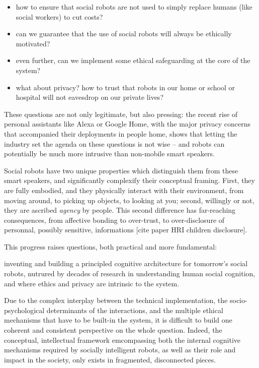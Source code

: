 \documentclass[11pt]{article}
\begin{document}
\begin{itemize}
    \item how to ensure that social robots are not used to simply replace humans
        (like social workers) to cut costs?
    \item can we guarantee that the use of social robots will always be ethically motivated?
    \item even further, can we implement some ethical safeguarding at the core
        of the system?
    \item what about privacy? how to trust that robots in our home or school or
        hospital will not eavesdrop on our private lives?
\end{itemize}

These questions are not only legitimate, but also pressing: the recent rise of
personal assistants like Alexa or Google Home, with the major privacy concerns
that accompanied their deployments in people home, shows that letting the
industry set the agenda on these questions is not wise -- and robots can
potentially be much more intrusive than non-mobile smart speakers.

Social robots have two unique properties which distinguish them from these smart
speakers, and significantly complexify their conceptual framing. First, they are
fully embodied, and they physically interact with their environment, from moving
around, to picking up objects, to looking at you; second, willingly or not, they
are ascribed \emph{agency} by people.  This second difference has far-reaching
consequences, from affective bonding to over-trust, to over-disclosure of
personnal, possibly sensitive, informations [cite paper HRI children
disclosure].



This progress raises questions, both practical and more fundamental:

inventing and building a principled cognitive architecture for tomorrow's social
robots, nutrured by decades of research in understanding human social cognition,
and where ethics and privacy are intrinsic to the system.

Due to the complex interplay between the technical implementation, the
socio-psychological determinants of the interactions, and the multiple ethical
mechanisms that have to be built-in the system, it is difficult to build one
coherent and consistent perspective on the whole question. Indeed, the
conceptual, intellectual framework emcompassing both the internal cognitive
mechanisms required by socially intelligent robots, as well as their role and
impact in the society, only exists in fragmented, disconnected pieces.
\end{document}
